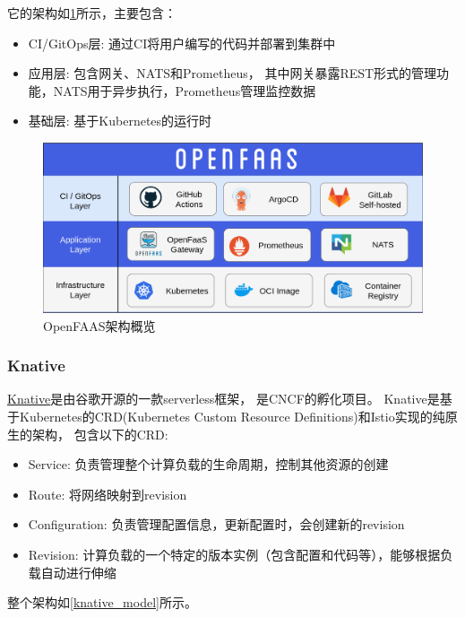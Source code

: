 它的架构如\cref{openfaas_arch}所示\cite{openfaas_arch}，主要包含：

\begin{itemize}
    \item CI/GitOps层: 通过CI将用户编写的代码并部署到集群中
    \item 应用层: 包含网关、NATS和Prometheus，
    其中网关暴露REST形式的管理功能，NATS用于异步执行，Prometheus管理监控数据
    \item 基础层: 基于Kubernetes的运行时
\end{itemize}

\begin{figure}[ht!]
    \centering
    \includegraphics[width=\linewidth]{images/openfaas-overview.png}
    \caption{OpenFAAS架构概览}
    \label{openfaas_arch}
\end{figure}

\subsubsection{Knative}

\href{https://knative.dev/}{Knative}是由谷歌开源的一款serverless框架，
是CNCF的孵化项目。
Knative是基于Kubernetes的CRD(Kubernetes Custom Resource Definitions)和Istio实现的纯原生的架构，
包含以下的CRD:

\begin{itemize}
    \item Service: 负责管理整个计算负载的生命周期，控制其他资源的创建
    \item Route: 将网络映射到revision
    \item Configuration: 负责管理配置信息，更新配置时，会创建新的revision
    \item Revision: 计算负载的一个特定的版本实例（包含配置和代码等），能够根据负载自动进行伸缩
\end{itemize}

整个架构如\cref{knative_model}所示\cite{knative_concepts}。

